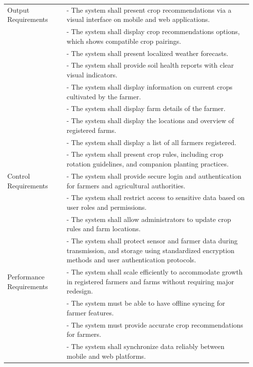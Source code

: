 {\begin{longtable}{p{4cm} p{9cm}}
		Output Requirements & - The system shall present crop recommendations via a visual interface on mobile and web applications. \\
		& - The system shall display crop recommendations options, which shows compatible crop pairings. \\
		& - The system shall present localized weather forecasts. \\
		& - The system shall provide soil health reports with clear visual indicators. \\
		& - The system shall display information on current crops cultivated by the farmer. \\
		& - The system shall display farm details of the farmer. \\
		& - The system shall display the locations and overview of registered farms. \\
		& - The system shall display a list of all farmers registered. \\
		& - The system shall present crop rules, including crop rotation guidelines, and companion planting practices. \\
		\midrule
		
		Control Requirements & - The system shall provide secure login and authentication for farmers and agricultural authorities. \\
		& - The system shall restrict access to sensitive data based on user roles and permissions. \\
		& - The system shall allow administrators to update crop rules and farm locations. \\
		& - The system shall protect sensor and farmer data during transmission, and storage using standardized encryption methods and user authentication protocols.\\
		\midrule
		
		Performance Requirements & - The system shall scale efficiently to accommodate growth in registered farmers and farms without requiring major redesign. \\
		& - The system must be able to have offline syncing for farmer features. \\
		& - The system must provide accurate crop recommendations for farmers. \\
		& - The system shall synchronize data reliably between mobile and web platforms.\\
	\end{longtable} 
	
}
